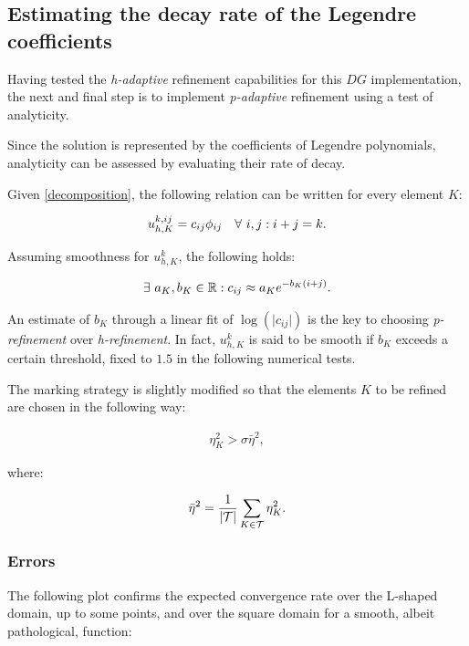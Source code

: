 \subsection{Estimating the decay rate of the Legendre coefficients}

Having tested the \textit{h-adaptive} refinement capabilities for this $DG$ implementation, the next and final step is to implement \textit{p-adaptive} refinement using a test of analyticity.

\cite{Eibner2007} Since the solution is represented by the coefficients of Legendre polynomials, analyticity can be assessed by evaluating their rate of decay.

Given \eqref{decomposition}, the following relation can be written for every element $K$:

\begin{gather}
    u^{k, ij}_{h, K} = c_{ij} \phi_{ij} \quad \forall ~ i, j : i + j = k.
\end{gather}

Assuming smoothness for $u^k_{h, K}$, the following holds:

\begin{gather}
    \exists ~ a_K, b_K \in \mathbb{R} : c_{ij} \approx a_K e^{-b_K (i + j)}.
\end{gather}

An estimate of $b_K$ through a linear fit of $\log(\lvert c_{ij} \rvert)$ is the key to choosing \textit{p-refinement} over \textit{h-refinement}. In fact, $u^k_{h, K}$ is said to be smooth if $b_K$ exceeds a certain threshold, fixed to $1.5$ in the following numerical tests.

The marking strategy is slightly modified so that the elements $K$ to be refined are chosen in the following way:

\begin{gather}
    \eta_K^2 > \sigma \bar{\eta}^2,
\end{gather}

where:

\begin{gather}
    \bar{\eta}^2 = \frac{1}{\lvert \mathcal{T} \rvert} \sum_{K \in \mathcal{T}} \eta_K^2.
\end{gather}

\newpage
\subsubsection{Errors}

\cite{Eibner2007} The following plot confirms the expected convergence rate over the L-shaped domain, up to some points, and over the square domain for a smooth, albeit pathological, function:

